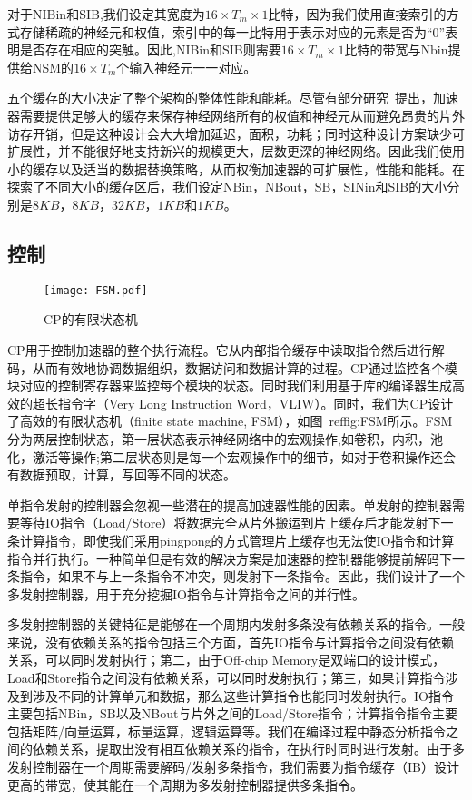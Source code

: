 对于NIBin和SIB,我们设定其宽度为$16\times T_m\times 1$比特，因为我们使用直接索引的方式存储稀疏的神经元和权值，索引中的每一比特用于表示对应的元素是否为“0”表明是否存在相应的突触。因此,NIBin和SIB则需要$16\times T_m\times 1$比特的带宽与Nbin提供给NSM的$16\times T_m$个输入神经元一一对应。

五个缓存的大小决定了整个架构的整体性能和能耗。尽管有部分研究~\cite{chen2014dadiannao,han2016eie}提出，加速器需要提供足够大的缓存来保存神经网络所有的权值和神经元从而避免昂贵的片外访存开销，但是这种设计会大大增加延迟，面积，功耗；同时这种设计方案缺少可扩展性，并不能很好地支持新兴的规模更大，层数更深的神经网络。因此我们使用小的缓存以及适当的数据替换策略，从而权衡加速器的可扩展性，性能和能耗。在探索了不同大小的缓存区后，我们设定NBin，NBout，SB，SINin和SIB的大小分别是$8KB$，$8KB$，$32KB$，$1KB$和$1KB$。

\subsection{控制}

\begin{figure}[h]
\centering
\texttt{[image: FSM.pdf]}
\caption{CP的有限状态机}
\label{fig:FSM}
\end{figure}

CP用于控制加速器的整个执行流程。它从内部指令缓存中读取指令然后进行解码，从而有效地协调数据组织，数据访问和数据计算的过程。CP通过监控各个模块对应的控制寄存器来监控每个模块的状态。同时我们利用基于库的编译器生成高效的超长指令字（Very Long Instruction Word，VLIW）。同时，我们为CP设计了高效的有限状态机（finite state machine, FSM），如图~ref{fig:FSM}所示。FSM分为两层控制状态，第一层状态表示神经网络中的宏观操作,如卷积，内积，池化，激活等操作;第二层状态则是每一个宏观操作中的细节，如对于卷积操作还会有数据预取，计算，写回等不同的状态。

单指令发射的控制器会忽视一些潜在的提高加速器性能的因素。单发射的控制器需要等待IO指令（Load/Store）将数据完全从片外搬运到片上缓存后才能发射下一条计算指令，即使我们采用pingpong的方式管理片上缓存也无法使IO指令和计算指令并行执行。一种简单但是有效的解决方案是加速器的控制器能够提前解码下一条指令，如果不与上一条指令不冲突，则发射下一条指令。因此，我们设计了一个多发射控制器，用于充分挖掘IO指令与计算指令之间的并行性。

多发射控制器的关键特征是能够在一个周期内发射多条没有依赖关系的指令。一般来说，没有依赖关系的指令包括三个方面，首先IO指令与计算指令之间没有依赖关系，可以同时发射执行；第二，由于Off-chip Memory是双端口的设计模式，Load和Store指令之间没有依赖关系，可以同时发射执行；第三，如果计算指令涉及到涉及不同的计算单元和数据，那么这些计算指令也能同时发射执行。IO指令主要包括NBin，SB以及NBout与片外之间的Load/Store指令；计算指令指令主要包括矩阵/向量运算，标量运算，逻辑运算等。我们在编译过程中静态分析指令之间的依赖关系，提取出没有相互依赖关系的指令，在执行时同时进行发射。由于多发射控制器在一个周期需要解码/发射多条指令，我们需要为指令缓存（IB）设计更高的带宽，使其能在一个周期为多发射控制器提供多条指令。

